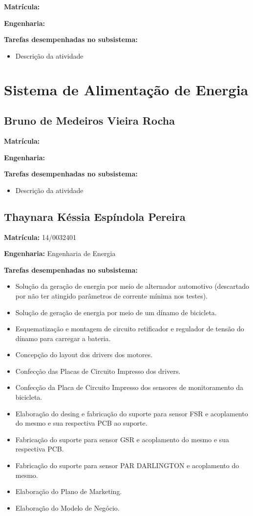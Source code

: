 \textbf{Matrícula:}

\textbf{Engenharia:}

\textbf{Tarefas desempenhadas no subsistema:}

\begin{itemize}
\item Descrição da atividade
\end{itemize}


\section{Sistema de Alimentação de Energia}

\subsection{Bruno de Medeiros Vieira Rocha}

\textbf{Matrícula:}

\textbf{Engenharia:}

\textbf{Tarefas desempenhadas no subsistema:}

\begin{itemize}
\item Descrição da atividade
\end{itemize}


\subsection{Thaynara Késsia Espíndola Pereira}

\textbf{Matrícula:} 14/0032401

\textbf{Engenharia:} Engenharia de Energia 

\textbf{Tarefas desempenhadas no subsistema:}

\begin{itemize}
\item 
Solução da geração de energia por meio de alternador automotivo (descartado por não ter atingido parâmetros de corrente mínima nos testes).
\item 
Solução de geração de energia por meio de um dínamo de bicicleta.
\item 
Esquematização e montagem de circuito retificador e regulador de tensão do dínamo para carregar a bateria. 
\item 
Concepção do layout dos drivers dos motores.
\item 
Confecção das Placas de Circuito Impresso dos drivers. 
\item 
Confecção da Placa de Circuito Impresso dos sensores de monitoramento da bicicleta.
\item 
Elaboração do desing e fabricação do suporte para sensor FSR e acoplamento do mesmo e sua respectiva PCB ao suporte.  
\item 
Fabricação do suporte para sensor GSR e acoplamento do mesmo e sua respectiva PCB. 
\item 
Fabricação do suporte para sensor PAR DARLINGTON e acoplamento do mesmo. 
\item 
Elaboração do Plano de Marketing.
\item 
Elaboração do Modelo de Negócio.
\end{itemize}

